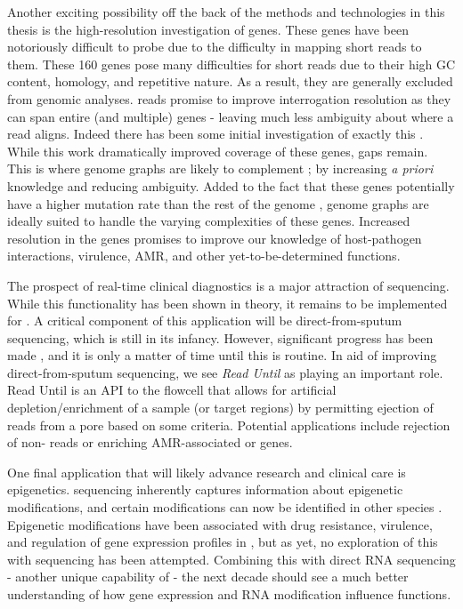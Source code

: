 Another exciting possibility off the back of the methods and technologies in this thesis is the high-resolution investigation of \ppe{} genes. These genes have been notoriously difficult to probe due to the difficulty in mapping short reads to them. These 160 genes pose many difficulties for short reads due to their high GC content, homology, and repetitive nature. As a result, they are generally excluded from genomic analyses. \ont{} reads promise to improve interrogation resolution as they can span entire (and multiple) \ppe{} genes - leaving much less ambiguity about where a read aligns. Indeed there has been some initial investigation of exactly this \cite{bainomugisa2018}. While this work dramatically improved coverage of these genes, gaps remain. This is where genome graphs are likely to complement \ont{}; by increasing \textit{a priori} knowledge and reducing ambiguity. Added to the fact that these genes potentially have a higher mutation rate than the rest of the genome \cite{bainomugisa2018}, genome graphs are ideally suited to handle the varying complexities of these genes. Increased resolution in the \ppe{} genes promises to improve our knowledge of \mtb{} host-pathogen interactions, virulence, AMR, and other yet-to-be-determined functions.

The prospect of real-time clinical diagnostics is a major attraction of \ont{} sequencing. While this functionality has been shown in theory, it remains to be implemented for \mtb{}. A critical component of this application will be direct-from-sputum \ont{} sequencing, which is still in its infancy. However, significant progress has been made \cite{George2020,Votintseva2017}, and it is only a matter of time until this is routine. In aid of improving direct-from-sputum sequencing, we see \emph{Read Until} \cite{Payne2021,Kovaka2021} as playing an important role. Read Until is an API to the flowcell that allows for artificial depletion/enrichment of a sample (or target regions) by permitting ejection of reads from a pore based on some criteria. Potential applications include rejection of non-\mtb{} reads or enriching AMR-associated or \ppe{} genes.

One final application that will likely advance \mtb{} research and clinical care is epigenetics. \ont{} sequencing inherently captures information about epigenetic modifications, and certain modifications can now be identified in other species \cite{Furlan2021}. Epigenetic modifications have been associated with drug resistance, virulence, and regulation of gene expression profiles in \mtb{} \cite{Phelan2018Methylation,Shell2013,Zhu2016Precision}, but as yet, no exploration of this with \ont{} sequencing has been attempted. Combining this with direct RNA sequencing - another unique capability of \ont{} - the next decade should see a much better understanding of how gene expression and RNA modification influence \mtb{} functions.
